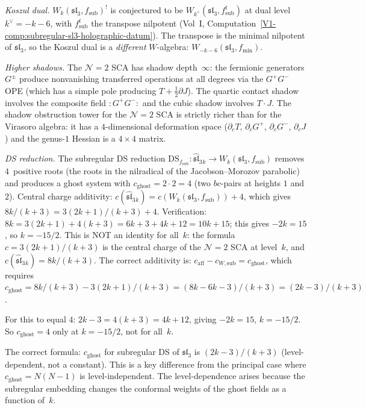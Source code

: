 \begin{conjecture}[Ordered bar complex for the
$\mathcal N=2$ superconformal algebra;
\ClaimStatusConjectured]
\emph{Koszul dual.}
$W_k(\mathfrak{sl}_3,f_{\mathrm{sub}})^!$ is conjectured to be
$W_{k^\vee}(\mathfrak{sl}_3,f_{\mathrm{sub}}^t)$
at dual level $k^\vee=-k-6$, with $f_{\mathrm{sub}}^t$ the
transpose nilpotent (Vol~I,
Computation~\ref*{V1-comp:subregular-sl3-holographic-datum}).
The transpose is the minimal nilpotent of $\mathfrak{sl}_3$,
so the Koszul dual is a \emph{different} $W$-algebra:
$W_{-k-6}(\mathfrak{sl}_3,f_{\min})$.

\emph{Higher shadows.}
The $\mathcal N=2$ SCA has shadow depth~$\infty$:
the fermionic generators $G^\pm$ produce nonvanishing
transferred operations at all degrees via the $G^+G^-$ OPE
(which has a simple pole producing $T+\frac12\partial J$).
The quartic contact shadow involves the composite field
${:}G^+G^-{:}$ and the cubic shadow involves $T\cdot J$.
The shadow obstruction tower for the $\mathcal N=2$ SCA is strictly
richer than for the Virasoro algebra: it has a
$4$-dimensional deformation space
($\partial_c T$, $\partial_c G^+$, $\partial_c G^-$,
$\partial_c J$) and the genus-$1$ Hessian is a
$4\times 4$ matrix.

\emph{DS reduction.}
The subregular DS reduction
$\mathrm{DS}_{f_{\mathrm{sub}}}\colon
\widehat{\mathfrak{sl}}_3{}_k
\to W_k(\mathfrak{sl}_3,f_{\mathrm{sub}})$
removes $4$~positive roots (the roots in the nilradical
of the Jacobson--Morozov parabolic) and produces a ghost
system with $c_{\mathrm{ghost}}=2\cdot 2=4$ (two
$bc$-pairs at heights $1$ and $2$). Central charge
additivity:
$c(\widehat{\mathfrak{sl}}_3{}_k)
=c(W_k(\mathfrak{sl}_3,f_{\mathrm{sub}}))+4$,
which gives
$8k/(k+3)=3(2k+1)/(k+3)+4$.
Verification: $8k=3(2k+1)+4(k+3)=6k+3+4k+12=10k+15$;
this gives $-2k=15$, so $k=-15/2$. This is NOT an identity
for all~$k$: the formula $c=3(2k+1)/(k+3)$ is the central
charge of the $\mathcal N=2$ SCA at level~$k$, and
$c(\widehat{\mathfrak{sl}}_3{}_k)=8k/(k+3)$. The correct
additivity is:
$c_{\mathrm{aff}}-c_{W,\mathrm{sub}}=c_{\mathrm{ghost}}$,
which requires
$c_{\mathrm{ghost}}=8k/(k+3)-3(2k+1)/(k+3)
=(8k-6k-3)/(k+3)=(2k-3)/(k+3)$.

For this to equal $4$: $2k-3=4(k+3)=4k+12$, giving
$-2k=15$, $k=-15/2$. So $c_{\mathrm{ghost}}=4$ only at
$k=-15/2$, not for all~$k$.

The correct formula: $c_{\mathrm{ghost}}$ for subregular
DS of $\mathfrak{sl}_3$ is $(2k-3)/(k+3)$
(level-dependent, not a constant). This is a key
difference from the principal case where
$c_{\mathrm{ghost}}=N(N-1)$ is level-independent.
The level-dependence arises because the subregular
embedding changes the conformal weights of the ghost
fields as a function of~$k$.
\end{conjecture}

